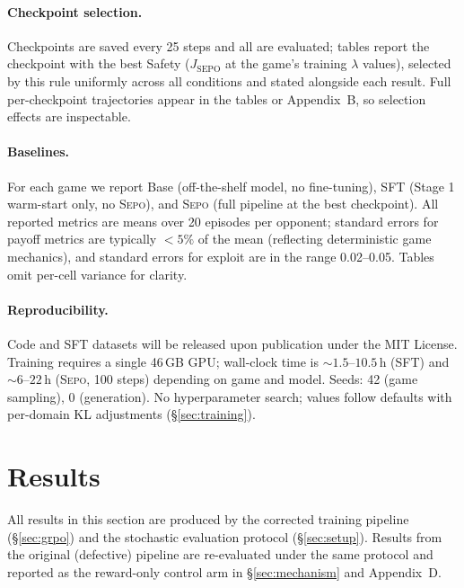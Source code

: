 \documentclass[letterpaper]{article} %
\newcommand{\sepo}{\textsc{Sepo}}
\newcommand{\Jsepo}{J_{\text{SEPO}}}
\begin{document}
\paragraph{Checkpoint selection.} Checkpoints are saved every 25 steps and all are evaluated; tables report the checkpoint with the best Safety ($\Jsepo$ at the game's training $\lambda$ values), selected by this rule uniformly across all conditions and stated alongside each result. Full per-checkpoint trajectories appear in the tables or Appendix~B, so selection effects are inspectable.
\paragraph{Baselines.} For each game we report Base (off-the-shelf model, no fine-tuning), SFT (Stage 1 warm-start only, no \sepo{}), and \sepo{} (full pipeline at the best checkpoint). All reported metrics are means over 20 episodes per opponent; standard errors for payoff metrics are typically $< 5\%$ of the mean (reflecting deterministic game mechanics), and standard errors for exploit are in the range 0.02--0.05. Tables omit per-cell variance for clarity.
\paragraph{Reproducibility.} Code and SFT datasets will be released upon publication under the MIT License. Training requires a single 46\,GB GPU; wall-clock time is ${\sim}1.5$--$10.5$\,h (SFT) and ${\sim}6$--$22$\,h (\sepo{}, 100 steps) depending on game and model. Seeds: 42 (game sampling), 0 (generation). No hyperparameter search; values follow \citet{shao2024deepseekmath} defaults with per-domain KL adjustments (\S\ref{sec:training}).
\section{Results}
\label{sec:results}
All results in this section are produced by the corrected training pipeline (\S\ref{sec:grpo}) and the stochastic evaluation protocol (\S\ref{sec:setup}). Results from the original (defective) pipeline are re-evaluated under the same protocol and reported as the reward-only control arm in \S\ref{sec:mechanism} and Appendix~D.
\end{document}
